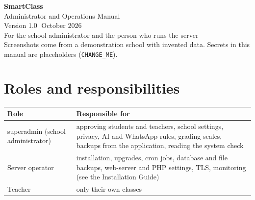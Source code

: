 \documentclass[11pt,a4paper]{article}
\newcommand{\manualversion}{1.0}
\begin{document}
\begin{titlepage}
\centering\sffamily
\vspace*{3cm}
{\Huge\bfseries\color{brand} SmartClass}\\[6pt]
{\LARGE Administrator and Operations Manual}\\[2cm]
{\large Version \manualversion\quad| October 2026}\\[1cm]
For the school administrator and the person who runs the server\\[4cm]
{\small Screenshots come from a demonstration school with invented data. Secrets in this manual are placeholders (\texttt{CHANGE\_ME}).}
\end{titlepage}
\tableofcontents\clearpage

\section{Roles and responsibilities}
\begin{tabular}{@{}p{3.4cm}p{11cm}@{}}
\toprule\textbf{Role} & \textbf{Responsible for}\\\midrule
\gls{superadmin} (school administrator) & approving students and teachers, school settings, privacy, AI and WhatsApp rules, grading scales, backups from the application, reading the system check\\
Server operator & installation, upgrades, cron jobs, database and file backups, web-server and PHP settings, TLS, monitoring (see the Installation Guide)\\
Teacher & only their own classes\\
\bottomrule\end{tabular}
\end{document}
